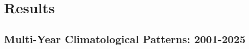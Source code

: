 

\ifpdf
\graphicspath{{chapters/Figs/}{chapters/Figs/Raster/}{Figs/PDF/}{Figs/}}
\else
\graphicspath{{chapters/Figs/}{chapters/Figs/Vector/}{Figs/}}
\fi

\chapter{Results}
\label{ch:results}

\section{Multi-Year Climatological Patterns: 2001-2025}
\label{sec:results_multiyear}

